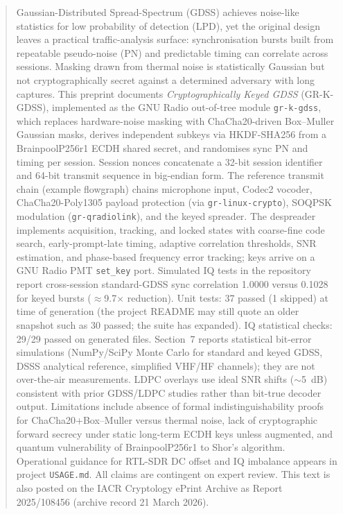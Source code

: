 \documentclass[10pt,a4paper,twocolumn]{article}
\begin{document}
\begin{abstract}
\noindent
Gaussian-Distributed Spread-Spectrum (GDSS) achieves noise-like statistics for low probability of detection (LPD), yet the original design leaves a practical traffic-analysis surface: synchronisation bursts built from repeatable pseudo-noise (PN) and predictable timing can correlate across sessions. Masking drawn from thermal noise is statistically Gaussian but not cryptographically secret against a determined adversary with long captures. This preprint documents \emph{Cryptographically Keyed GDSS} (GR-K-GDSS), implemented as the GNU Radio out-of-tree module \texttt{gr-k-gdss}, which replaces hardware-noise masking with ChaCha20-driven Box--Muller Gaussian masks, derives independent subkeys via HKDF-SHA256 from a BrainpoolP256r1 ECDH shared secret, and randomises sync PN and timing per session. Session nonces concatenate a 32-bit session identifier and 64-bit transmit sequence in big-endian form. The reference transmit chain (example flowgraph) chains microphone input, Codec2 vocoder, ChaCha20-Poly1305 payload protection (via \texttt{gr-linux-crypto}), SOQPSK modulation (\texttt{gr-qradiolink}), and the keyed spreader. The despreader implements acquisition, tracking, and locked states with coarse-fine code search, early-prompt-late timing, adaptive correlation thresholds, SNR estimation, and phase-based frequency error tracking; keys arrive on a GNU Radio PMT \texttt{set\_key} port. Simulated IQ tests in the repository report cross-session standard-GDSS sync correlation 1.0000 versus 0.1028 for keyed bursts ($\approx$9.7$\times$ reduction). Unit tests: 37 passed (1 skipped) at time of generation (the project README may still quote an older snapshot such as 30 passed; the suite has expanded). IQ statistical checks: 29/29 passed on generated files. Section~7 reports statistical bit-error simulations (NumPy/SciPy Monte Carlo for standard and keyed GDSS, DSSS analytical reference, simplified VHF/HF channels); they are not over-the-air measurements. LDPC overlays use ideal SNR shifts ($\sim$5~dB) consistent with prior GDSS/LDPC studies rather than bit-true decoder output. Limitations include absence of formal indistinguishability proofs for ChaCha20+Box--Muller versus thermal noise, lack of cryptographic forward secrecy under static long-term ECDH keys unless augmented, and quantum vulnerability of BrainpoolP256r1 to Shor's algorithm. Operational guidance for RTL-SDR DC offset and IQ imbalance appears in project \texttt{USAGE.md}. All claims are contingent on expert review. This text is also posted on the IACR Cryptology ePrint Archive as Report 2025/108456 (archive record 21 March 2026).
\end{abstract}
\vspace{16pt}
\end{document}
